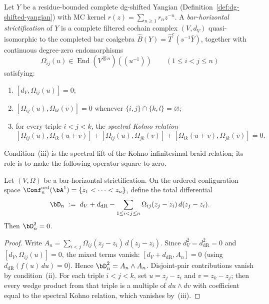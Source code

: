 \begin{definition}
\label{def:bar-horizontal-strictification}
Let $Y$ be a residue-bounded complete dg-shifted Yangian
(Definition~\ref{def:dg-shifted-yangian}) with MC kernel
$r(z) = \sum_{n \ge 1} r_n z^{-n}$.
A \emph{bar-horizontal strictification} of $Y$ is a complete
filtered cochain complex $(V,d_V)$ quasi-isomorphic to the
completed bar coalgebra $\widehat{B}(Y) = \widehat{T}^c(s^{-1}\bar{Y})$,
together with continuous degree-zero endomorphisms
\[
 \Omega_{ij}(u) \in \operatorname{End}(V^{\widehat\otimes n})(\!(u^{-1})\!)
 \qquad (1 \le i < j \le n)
\]
satisfying:
\begin{enumerate}[label=\textup{(\roman*)}]
\item $[d_V, \Omega_{ij}(u)] = 0$;
\item $[\Omega_{ij}(u), \Omega_{kl}(v)] = 0$
 whenever $\{i,j\} \cap \{k,l\} = \varnothing$;
\item for every triple $i < j < k$, the \emph{spectral
 Kohno relation}
 \[
 [\Omega_{ij}(u), \Omega_{ik}(u+v)]
 + [\Omega_{ij}(u), \Omega_{jk}(v)]
 + [\Omega_{ik}(u+v), \Omega_{jk}(v)] = 0.
 \]
\end{enumerate}
\end{definition}

Condition~(iii) is the spectral lift of the Kohno infinitesimal
braid relation; its role is to make the following operator
square to zero.

\begin{theorem}
\label{thm:spectral-derived-additive-kz}
Let $(V,\Omega)$ be a bar-horizontal strictification. On the
ordered configuration space
$\Conf_n^{\mathrm{ord}}(\bA^1) = \{z_1 < \cdots < z_n\}$,
define the total differential
\[
 \bD_n
 \;:=\;
 d_V + d_{\mathrm{dR}}
 - \sum_{1 \le i < j \le n}
 \Omega_{ij}(z_j - z_i)\,d(z_j - z_i).
\]
Then $\bD_n^2 = 0$.
\end{theorem}

\begin{proof}
Write $A_n = \sum_{i<j} \Omega_{ij}(z_j-z_i)\,d(z_j-z_i)$.
Since $d_V^2 = d_{\mathrm{dR}}^2 = 0$ and
$[d_V, \Omega_{ij}(u)] = 0$, the mixed terms vanish:
$[d_V + d_{\mathrm{dR}}, A_n] = 0$
(using $d_{\mathrm{dR}}(f(u)\,du) = 0$). Hence
$\bD_n^2 = A_n \wedge A_n$. Disjoint-pair contributions
vanish by condition~(ii). For each triple $i < j < k$, set
$u = z_j - z_i$ and $v = z_k - z_j$; then every wedge product
from that triple is a multiple of $du \wedge dv$ with
coefficient equal to the spectral Kohno relation, which
vanishes by~(iii).
\end{proof}

